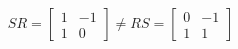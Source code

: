 \documentclass[preview]{standalone}
\begin{document}
\begin{align*}
SR=\begin{bmatrix}1&-1\\1&0\end{bmatrix} \neq RS=\begin{bmatrix}0&-1\\1&1\end{bmatrix}
\end{align*}
\end{document}
